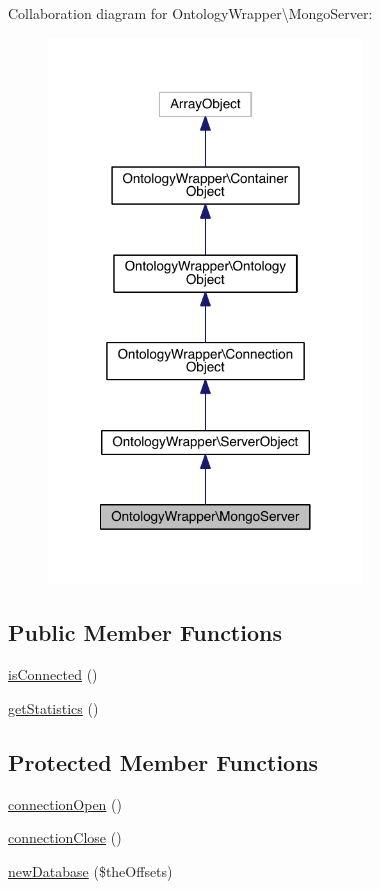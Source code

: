 Collaboration diagram for Ontology\-Wrapper\textbackslash{}Mongo\-Server\-:
\nopagebreak
\begin{figure}[H]
\begin{center}
\leavevmode
\includegraphics[width=236pt]{class_ontology_wrapper_1_1_mongo_server__coll__graph}
\end{center}
\end{figure}
\subsection*{Public Member Functions}
\begin{DoxyCompactItemize}
\item 
\hyperlink{class_ontology_wrapper_1_1_mongo_server_a2bde1d3f28624801cbb42bf8b94673d4}{is\-Connected} ()
\item 
\hyperlink{class_ontology_wrapper_1_1_mongo_server_ad0339362ebaba5c344a179ef11d4e102}{get\-Statistics} ()
\end{DoxyCompactItemize}
\subsection*{Protected Member Functions}
\begin{DoxyCompactItemize}
\item 
\hyperlink{class_ontology_wrapper_1_1_mongo_server_abd478e3c641bbe1f40f7edf41e986558}{connection\-Open} ()
\item 
\hyperlink{class_ontology_wrapper_1_1_mongo_server_a0817afd4db82e176e0ebb6c7d5752e6e}{connection\-Close} ()
\item 
\hyperlink{class_ontology_wrapper_1_1_mongo_server_a511427a098b640515401bbb6baba7515}{new\-Database} (\$the\-Offsets)
\end{DoxyCompactItemize}

